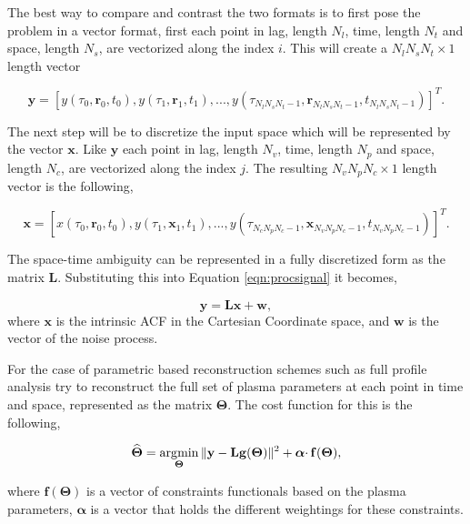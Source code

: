 The best way to compare and contrast the two formats is to first pose the problem in a vector format, first each point in lag, length $N_l$, time, length $N_t$ and space, length $N_s$, are vectorized along the index $i$. This will create a $N_lN_sN_t\times 1$ length vector 

\begin{equation}
\label{eqn:vec1}
\mathbf{y}=[y(\tau_0,\mathbf{r}_0,t_0), y(\tau_1,\mathbf{r}_1,t_1),..., y(\tau_{N_l N_s N_t -1}, \mathbf{r}_{N_l N_s N_t -1}, t_{N_l N_s N_t -1})]^T.
\end{equation}

The next step will be to discretize the input space which will be represented by the vector $\mathbf{x}$. Like $\mathbf{y}$ each point in lag, length $N_v$, time, length $N_p$ and space, length $N_c$, are vectorized along the index $j$. The resulting $N_vN_pN_c\times 1$ length vector is the following,

\begin{equation}
\label{eqn:vecr}
\mathbf{x}=[x(\tau_0,\mathbf{r}_0,t_0), y(\tau_1,\mathbf{x}_1,t_1),..., y(\tau_{N_c N_p N_c -1}, \mathbf{x}_{N_v N_p N_c -1}, t_{N_v N_p N_c -1})]^T.
\end{equation}

The space-time ambiguity can be represented in a fully discretized form as the matrix $\mathbf{L}$. Substituting this into Equation \ref{eqn:procsignal} it becomes,

\begin{equation}
\label{eqn:procsignalvec}
 \mathbf{y} = \mathbf{L}\mathbf{x}+ \mathbf{w},
\end{equation}
\noindent where $\mathbf{x}$ is the intrinsic ACF in the Cartesian Coordinate space, and $\mathbf{w}$ is the vector of the noise process.

For the case of parametric based reconstruction schemes such as full profile analysis try to reconstruct the full set of plasma parameters at each point in time and space, represented as the matrix $\boldsymbol{\Theta}$. The cost function for this is the following, 

\begin{equation}
\label{eqn:lstsqrsvecpb}
\widehat{\boldsymbol{\Theta}} = \operatorname*{\arg\!\min}\limits_{\boldsymbol{\Theta}} \|\mathbf{y} -\mathbf{L}\mathbf{ g}(\boldsymbol{\Theta}) \|^2 + \boldsymbol{\alpha}\cdotp\mathbf{f}(\boldsymbol{\Theta}),
\end{equation}

\noindent where $\mathbf{f}(\boldsymbol{\Theta})$ is a vector of constraints functionals based on the plasma parameters, $\boldsymbol{\alpha}$ is a vector that holds the different weightings for these constraints.

